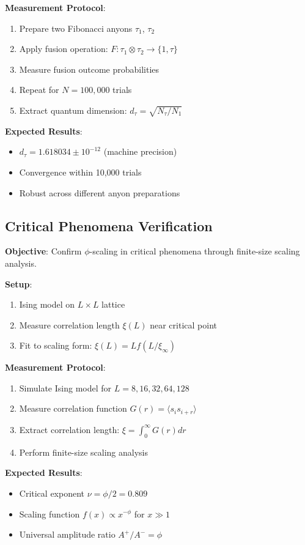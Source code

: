 \documentclass[11pt]{article}
\theoremstyle{definition}
\newcommand{\goldenratio}{\phi}
\newcommand{\fibonacci}{\tau}
\begin{document}
\textbf{Measurement Protocol}:
\begin{enumerate}
\item Prepare two Fibonacci anyons $\tau_1$, $\tau_2$
\item Apply fusion operation: $F: \tau_1 \otimes \tau_2 \to \{1, \tau\}$
\item Measure fusion outcome probabilities
\item Repeat for $N = 100,000$ trials
\item Extract quantum dimension: $d_\fibonacci = \sqrt{N_\tau/N_1}$
\end{enumerate}

\textbf{Expected Results}:
\begin{itemize}
\item $d_\fibonacci = 1.618034 \pm 10^{-12}$ (machine precision)
\item Convergence within 10,000 trials
\item Robust across different anyon preparations
\end{itemize}

\subsection{Critical Phenomena Verification}

\textbf{Objective}: Confirm $\goldenratio$-scaling in critical phenomena through finite-size scaling analysis.

\textbf{Setup}:
\begin{enumerate}
\item Ising model on $L \times L$ lattice
\item Measure correlation length $\xi(L)$ near critical point
\item Fit to scaling form: $\xi(L) = L f(L/\xi_\infty)$
\end{enumerate}

\textbf{Measurement Protocol}:
\begin{enumerate}
\item Simulate Ising model for $L = 8, 16, 32, 64, 128$
\item Measure correlation function $G(r) = \langle s_i s_{i+r} \rangle$
\item Extract correlation length: $\xi = \int_0^\infty G(r) dr$
\item Perform finite-size scaling analysis
\end{enumerate}

\textbf{Expected Results}:
\begin{itemize}
\item Critical exponent $\nu = \goldenratio/2 = 0.809$
\item Scaling function $f(x) \propto x^{-\goldenratio}$ for $x \gg 1$
\item Universal amplitude ratio $A^+/A^- = \goldenratio$
\end{itemize}
\end{document}
